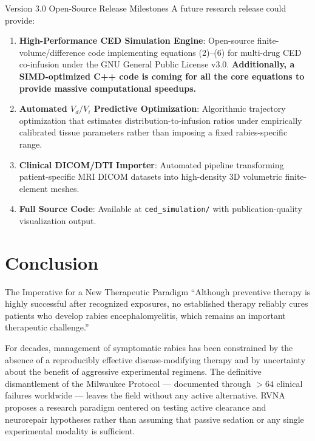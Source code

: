 \documentclass[12pt,a4paper]{article}
\begin{document}
\begin{protocolbox}{Version 3.0 Open-Source Release Milestones}
A future research release could provide:
\begin{enumerate}
    \item \textbf{High-Performance CED Simulation Engine}: Open-source finite-volume/difference code implementing equations (2)--(6) for multi-drug CED co-infusion under the GNU General Public License v3.0. \textbf{Additionally, a SIMD-optimized C++ code is coming for all the core equations to provide massive computational speedups.}
    \item \textbf{Automated $V_d/V_i$ Predictive Optimization}: Algorithmic trajectory optimization that estimates distribution-to-infusion ratios under empirically calibrated tissue parameters rather than imposing a fixed rabies-specific range.
    \item \textbf{Clinical DICOM/DTI Importer}: Automated pipeline transforming patient-specific MRI DICOM datasets into high-density 3D volumetric finite-element meshes.
    \item \textbf{Full Source Code}: Available at \texttt{ced\_simulation/} with publication-quality visualization output.
\end{enumerate}
\end{protocolbox}

\section{Conclusion}

\begin{jacksonpearl}{The Imperative for a New Therapeutic Paradigm}
``Although preventive therapy is highly successful after recognized exposures, no established therapy reliably cures patients who develop rabies encephalomyelitis, which remains an important therapeutic challenge.'' \citep{jackson2011therapy}
\end{jacksonpearl}

For decades, management of symptomatic rabies has been constrained by the absence of a reproducibly effective disease-modifying therapy and by uncertainty about the benefit of aggressive experimental regimens. The definitive dismantlement of the Milwaukee Protocol --- documented through $>64$ clinical failures worldwide \citep{jackson2025demise, jackson2026reply} --- leaves the field without any active alternative. RVNA proposes a research paradigm centered on testing active clearance and neurorepair hypotheses rather than assuming that passive sedation or any single experimental modality is sufficient.
\end{document}
